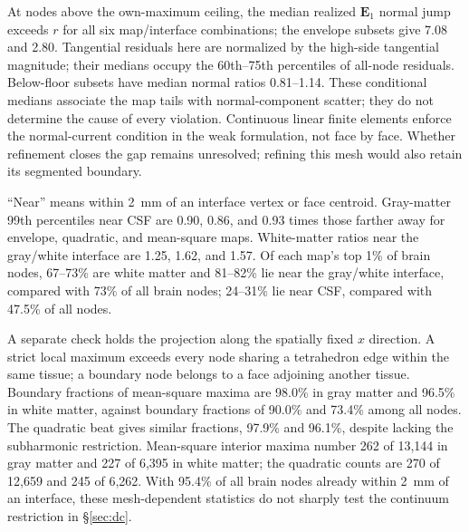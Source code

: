 \documentclass[11pt,a4paper]{article}
\providecommand{\DIFaddtex}[1]{{\protect\color{blue} \sf #1}} %
\providecommand{\DIFadd}[1]{\texorpdfstring{\DIFaddtex{#1}}{#1}} %
\begin{document}
\DIFadd{At nodes above the own-maximum ceiling, the median realized $\mathbf E_1$
normal jump exceeds $r$ for all six map/interface combinations; the envelope
subsets give 7.08 and 2.80. Tangential residuals here are normalized by the
high-side tangential magnitude; their medians occupy the 60th--75th
percentiles of all-node residuals. Below-floor subsets have median normal
ratios 0.81--1.14. These conditional medians associate the map tails with
normal-component scatter; they do not determine the cause of every violation.
Continuous linear finite elements enforce the normal-current condition in
the weak formulation, not face by face. Whether refinement closes the gap
remains unresolved; refining this mesh would also retain its segmented boundary.
}

\DIFadd{``Near'' means within 2~mm of an interface vertex or face centroid.
Gray-matter 99th percentiles near CSF are 0.90, 0.86, and 0.93 times those
farther away for envelope, quadratic, and mean-square maps. White-matter
ratios near the gray/white interface are 1.25, 1.62, and 1.57. Of each map's
top 1\% of brain nodes, 67--73\% are white matter and 81--82\% lie near the
gray/white interface, compared with 73\% of all brain nodes; 24--31\% lie
near CSF, compared with 47.5\% of all nodes.
}

\DIFadd{A separate check holds the projection along the spatially fixed $x$ direction.
A strict local maximum exceeds every node sharing a tetrahedron edge within
the same tissue; a boundary node belongs to a face adjoining another tissue.
Boundary fractions of mean-square maxima are 98.0\% in gray matter and
96.5\% in white matter, against boundary fractions of 90.0\% and 73.4\%
among all nodes. The quadratic beat gives similar fractions, 97.9\% and
96.1\%, despite lacking the subharmonic restriction. Mean-square interior
maxima number 262 of 13,144 in gray matter and 227 of 6,395 in white matter;
the quadratic counts are 270 of 12,659 and 245 of 6,262. With 95.4\% of all
brain nodes already within 2~mm of an interface, these mesh-dependent
statistics do not sharply test the continuum restriction in \S\ref{sec:dc}.
}
\end{document}
